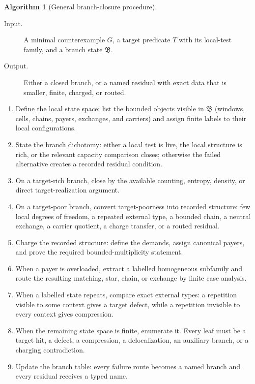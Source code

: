 \documentclass[
  11pt,
]{article}
\providecommand{\tightlist}{%
  \setlength{\itemsep}{0pt}\setlength{\parskip}{0pt}}
\theoremstyle{definition}
\newtheorem{algorithm}{Algorithm}
\begin{document}
\begin{algorithm}[General branch-closure procedure]\label{alg:general-branch-closure}
\leavevmode
\begin{description}
\item[Input.] A minimal counterexample \(G\), a target predicate \(T\)
with its local-test family, and a branch state \(\mathfrak B\).
\item[Output.] Either a closed branch, or a named residual with exact
data that is smaller, finite, charged, or routed.
\end{description}

\begin{enumerate}
\def\labelenumi{\arabic{enumi}.}
\tightlist
\item
Define the local state space: list the bounded objects visible in
\(\mathfrak B\) (windows, cells, chains, payers, exchanges, and
carriers) and assign finite labels to their local configurations.
\item
State the branch dichotomy: either a local test is live, the local
structure is rich, or the relevant capacity comparison closes; otherwise
the failed alternative creates a recorded residual condition.
\item
On a target-rich branch, close by the available counting, entropy,
density, or direct target-realization argument.
\item
On a target-poor branch, convert target-poorness into recorded
structure: few local degrees of freedom, a repeated external type, a
bounded chain, a neutral exchange, a carrier quotient, a charge
transfer, or a routed residual.
\item
Charge the recorded structure: define the demands, assign canonical
payers, and prove the required bounded-multiplicity statement.
\item
When a payer is overloaded, extract a labelled homogeneous subfamily and
route the resulting matching, star, chain, or exchange by finite case
analysis.
\item
When a labelled state repeats, compare exact external types: a repetition
visible to some context gives a target defect, while a repetition
invisible to every context gives compression.
\item
When the remaining state space is finite, enumerate it.  Every leaf must
be a target hit, a defect, a compression, a delocalization, an auxiliary
branch, or a charging contradiction.
\item
Update the branch table: every failure route becomes a named branch and
every residual receives a typed name.
\end{enumerate}
\end{algorithm}
\end{document}
